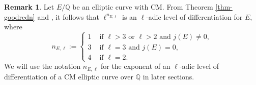 \documentclass[11pt]{amsart}
\newtheorem{definition}[defn]{Definition}
\newtheorem{theorem}[defn]{Theorem}
\theoremstyle{definition}
\newtheorem{remark}[defn]{Remark}
\newcommand{\Q}{\mathbb{Q}}
\newcommand{\Z}{\mathbb{Z}}
\newcommand{\GL}{\operatorname{GL}}
\DeclareMathOperator{\im}{im}  %
\begin{document}
\begin{remark}\label{ell-level-of-diff}\label{rem-ell-level-of-diff}
    Let $E/\Q$ be an elliptic curve with CM. From Theorem \ref{thm-goodredn} and \cite[Proposition 12.1.4]{elladic}, it follows that $\ell^{n_{E, \ell}}$ is an $\ell$-adic level of differentiation for $E$, where
\[ n_{E, \ell} := \begin{cases}
1 & \text{ if } \ell > 3 \text{ or } \ell > 2 \text{ and } j(E) \neq 0, \\
3 & \text{ if } \ell = 3 \text{ and } j(E) = 0, \\
4 & \text{ if } \ell = 2.
\end{cases} \]
We will use the notation $n_{E,\ell}$ for the exponent of an $\ell$-adic level of differentiation of a CM elliptic curve over $\Q$ in later sections.
\end{remark}







\end{document}
